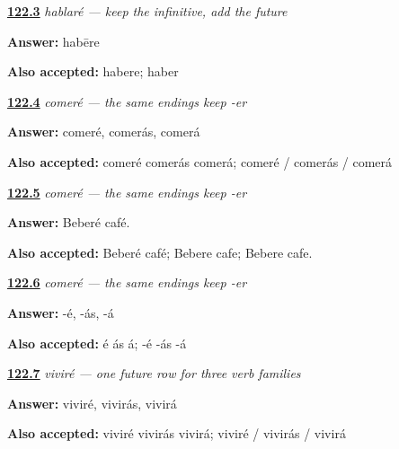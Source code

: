 \noindent\begin{minipage}[t]{\linewidth}
\raggedright
\hyperlink{review-ES-C17-futuro-history}{\textbf{122.3}} \emph{hablaré — keep the infinitive, add the future}\par
\small \textbf{Answer:} habēre\par
\footnotesize \textbf{Also accepted:} habere; haber
\end{minipage}\par\medskip

\noindent\begin{minipage}[t]{\linewidth}
\raggedright
\hyperlink{review-ES-C17-comer-futuro-singular-forms}{\textbf{122.4}} \emph{comeré — the same endings keep -er}\par
\small \textbf{Answer:} comeré, comerás, comerá\par
\footnotesize \textbf{Also accepted:} comeré comerás comerá; comeré / comerás / comerá
\end{minipage}\par\medskip

\noindent\begin{minipage}[t]{\linewidth}
\raggedright
\hyperlink{review-ES-C17-comer-futuro-cafe}{\textbf{122.5}} \emph{comeré — the same endings keep -er}\par
\small \textbf{Answer:} Beberé café.\par
\footnotesize \textbf{Also accepted:} Beberé café; Bebere cafe; Bebere cafe.
\end{minipage}\par\medskip

\noindent\begin{minipage}[t]{\linewidth}
\raggedright
\hyperlink{review-ES-C17-comer-futuro-shared-endings}{\textbf{122.6}} \emph{comeré — the same endings keep -er}\par
\small \textbf{Answer:} -é, -ás, -á\par
\footnotesize \textbf{Also accepted:} é ás á; -é -ás -á
\end{minipage}\par\medskip

\noindent\begin{minipage}[t]{\linewidth}
\raggedright
\hyperlink{review-ES-C17-vivir-futuro-singular-forms}{\textbf{122.7}} \emph{viviré — one future row for three verb families}\par
\small \textbf{Answer:} viviré, vivirás, vivirá\par
\footnotesize \textbf{Also accepted:} viviré vivirás vivirá; viviré / vivirás / vivirá
\end{minipage}\par\medskip

